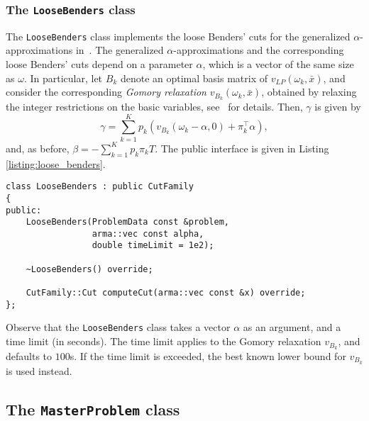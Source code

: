 \documentclass[12pt, english]{article}
\begin{document}
\subsubsection{The \texttt{LooseBenders} class}
\label{subsubsec:loose_benders}

The \texttt{LooseBenders} class implements the loose Benders' cuts for the generalized $\alpha$-approximations in~\cite{vanderLaan2020}.
The generalized $\alpha$-approximations and the corresponding loose Benders' cuts depend on a parameter $\alpha$, which is a vector of the same size as $\omega$.
In particular, let $B_k$ denote an optimal basis matrix of $v_{LP}(\omega_k, \bar x)$, and consider the corresponding \emph{Gomory relaxation} $v_{B_k}(\omega_k, \bar x)$, obtained by relaxing the integer restrictions on the basic variables, see~\cite{vanderLaan2020} for details.
Then, $\gamma$ is given by 
\[\gamma = \sum_{k = 1}^K p_k\left(v_{B_k}(\omega_k - \alpha, 0) + \pi_k^\top\alpha \right),\]
and, as before, $\beta = -\sum_{k = 1}^K p_k \pi_k T$. The public interface is given in Listing \ref{listing:loose_benders}.
\begin{lstlisting}[caption={Public interface of the \texttt{LooseBenders} class.}, 
                   label={listing:loose_benders}]
class LooseBenders : public CutFamily
{
public:
	LooseBenders(ProblemData const &problem,
			 	 arma::vec const alpha,
			 	 double timeLimit = 1e2);
	
	~LooseBenders() override;
	
	CutFamily::Cut computeCut(arma::vec const &x) override;
};
\end{lstlisting}
Observe that the \texttt{LooseBenders} class takes a vector $\alpha$ as an argument, and a time limit (in seconds). The time limit applies to the Gomory relaxation $v_{B_k}$, and defaults to $100$s. If the time limit is exceeded, the best known lower bound for $v_{B_k}$ is used instead.

\subsection{The \texttt{MasterProblem} class}
\label{subsec:master_problem_class}
\end{document}
